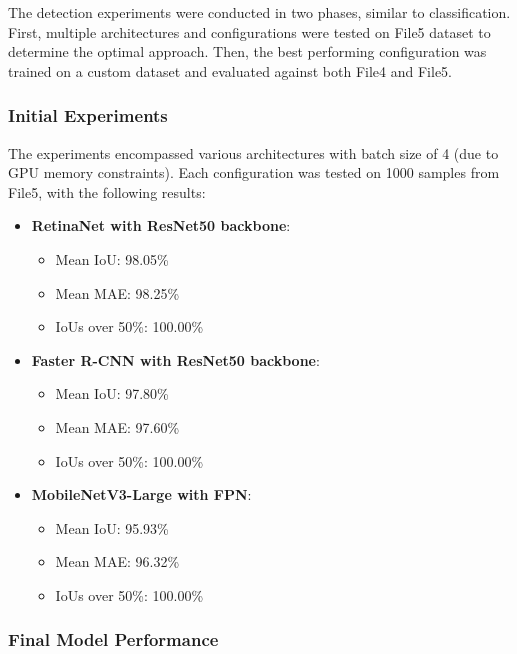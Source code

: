 \documentclass[conference]{IEEEtran}
\begin{document}
The detection experiments were conducted in two phases, similar to classification. First, multiple architectures
and configurations were tested on File5 dataset to determine the optimal approach. Then, the best performing
configuration was trained on a custom dataset and evaluated against both File4 and File5.

\subsubsection{Initial Experiments}

The experiments encompassed various architectures with batch size of 4 (due to GPU memory constraints). Each
configuration was tested on 1000 samples from File5, with the following results:

\begin{itemize}
    \item \textbf{RetinaNet with ResNet50 backbone}:
        \begin{itemize}
            \item Mean IoU: 98.05\%
            \item Mean MAE: 98.25\%
            \item IoUs over 50\%: 100.00\%
        \end{itemize}
    
    \item \textbf{Faster R-CNN with ResNet50 backbone}:
        \begin{itemize}
            \item Mean IoU: 97.80\%
            \item Mean MAE: 97.60\%
            \item IoUs over 50\%: 100.00\%
        \end{itemize}
    
    \item \textbf{MobileNetV3-Large with FPN}:
        \begin{itemize}
            \item Mean IoU: 95.93\%
            \item Mean MAE: 96.32\%
            \item IoUs over 50\%: 100.00\%
        \end{itemize}
\end{itemize}

\subsubsection{Final Model Performance}
\end{document}
